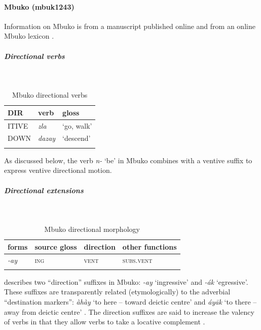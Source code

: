 \paragraph*{Mbuko (mbuk1243)} \label{mbuk}

Information on Mbuko is from a manuscript published online \citep{gravinaVerbPhraseMbuko2001} and from an online Mbuko lexicon \citep{gravinaMbukoLexicon2003,webonaryDictionnaireMbuko2016}. 

\subparagraph{Directional verbs}~

\begin{table}[H]
	\caption{Mbuko directional verbs} 
	\label{tab:mbukV}
	\begin{tabular}{lll} %
		\lsptoprule
		DIR & verb & gloss   \\ %
		\midrule
		ITIVE & \textit{zla} & `go, walk' \\
		DOWN & \textit{dazay} & `descend' \\
		\lspbottomrule
	\end{tabular}
\end{table}

As discussed below, the verb \textit{n-} `be' in Mbuko combines with a ventive suffix to express ventive directional motion. 

\subparagraph{Directional extensions}~

\begin{table}[H]
	\caption{Mbuko directional morphology}
	\label{tab:mbuk}
	\begin{tabular}{llll} %
		\lsptoprule
		forms & source gloss & direction  & other functions  \\ %
		\midrule
		\textit{-ay}  &  \textsc{ing}  &   \textsc{vent}  &   \textsc{subs.vent}  \\
		\lspbottomrule
	\end{tabular}
\end{table} 

\citet[7--8]{gravinaVerbPhraseMbuko2001} describes two ``direction'' suffixes in Mbuko: \textit{-ay} `ingressive' and \textit{-ák} `egressive'. These suffixes are transparently related (etymologically) to the adverbial ``destination markers'': \textit{àhày} `to here -- toward deictic centre' and \textit{áyāk} `to there -- away from deictic centre' \citep[18]{gravinaVerbPhraseMbuko2001}. The direction suffixes are said to increase the valency of verbs in that they allow verbs to take a locative complement \citep[11]{gravinaVerbPhraseMbuko2001}.

